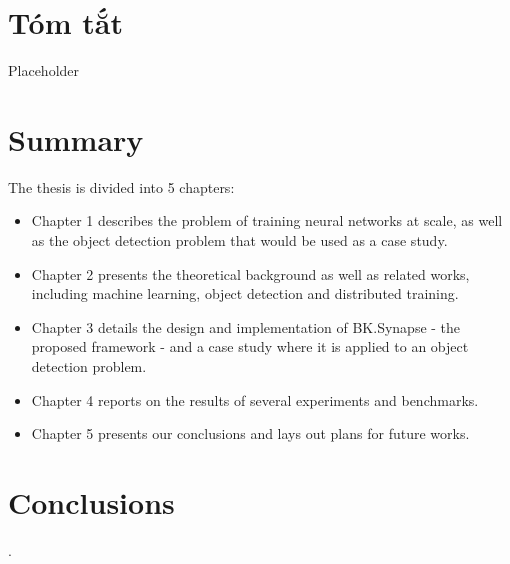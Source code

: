 \documentclass[a4paper, 13pt, oneside]{report}
\begin{document}
\chapter*{Tóm tắt}
Placeholder

\chapter*{Summary}
The thesis is divided into 5 chapters:
\begin{itemize}
    \item Chapter 1 describes the problem of training neural networks at scale, as well as the object detection problem that would be used as a case study.
    \item Chapter 2 presents the theoretical background as well as related works, including machine learning, object detection and distributed training.
    \item Chapter 3 details the design and implementation of BK.Synapse - the proposed framework - and a case study where it is applied to an object detection problem.
    \item Chapter 4 reports on the results of several experiments and benchmarks.
    \item Chapter 5 presents our conclusions and lays out plans for future works.
\end{itemize}

\pagebreak
{}
\tableofcontents
\pagebreak
{}
\listoffigures
\listoftables

\printglossary[type=\acronymtype,style=long, title=List of Abbreviations]
\printglossary
\pagebreak
\setcounter{page}{1}






\chapter{Conclusions}
.

\pagebreak



\end{document}
